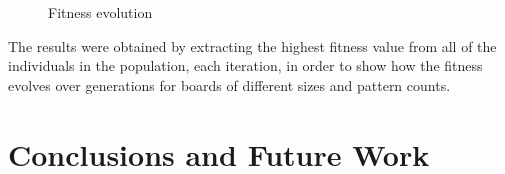 \documentclass{llncs}
\begin{document}
\begin{figure}[H]
  \centering
  \hspace{40mm}
  \caption{Fitness evolution}
  \label{fig:fitness_evolution}
\end{figure}

The results were obtained by extracting the highest fitness value from all of the individuals in the population, each iteration, in order to show how the fitness evolves over generations for boards of different sizes and pattern counts.

\section{Conclusions and Future Work}\label{sec:conclusions}
\end{document}
